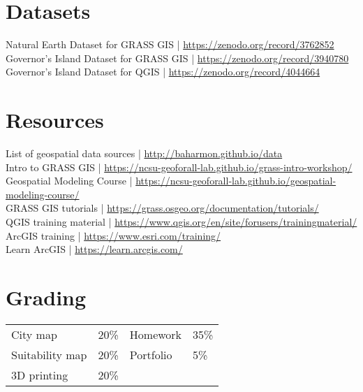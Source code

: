 \documentclass[11pt,article,oneside]{memoir}
\begin{document}
\section{Datasets}
Natural Earth Dataset for GRASS GIS | \url{https://zenodo.org/record/3762852}\\
Governor's Island Dataset for GRASS GIS | \url{https://zenodo.org/record/3940780}\\
Governor's Island Dataset for QGIS | \url{https://zenodo.org/record/4044664}\\

\section{Resources}
List of geospatial data sources | \url{http://baharmon.github.io/data}\\
Intro to GRASS GIS | \url{https://ncsu-geoforall-lab.github.io/grass-intro-workshop/}\\
Geospatial Modeling Course | \url{https://ncsu-geoforall-lab.github.io/geospatial-modeling-course/}\\
GRASS GIS tutorials | \url{https://grass.osgeo.org/documentation/tutorials/}\\
QGIS training material | \url{https://www.qgis.org/en/site/forusers/trainingmaterial/}\\
ArcGIS training | \url{https://www.esri.com/training/}\\
Learn ArcGIS | \url{https://learn.arcgis.com/}\\

\section{Grading}
%
\begin{table}[H]
\begin{tabular}{l r @{\hskip 2cm} l @{\hskip 0.5cm} l}
%
City map & 20\% & Homework & 35\% \\
Suitability map & 20\% & Portfolio & 5\% \\
3D printing & 20\% \\

%
\end{tabular}
\end{table}
\end{document}
